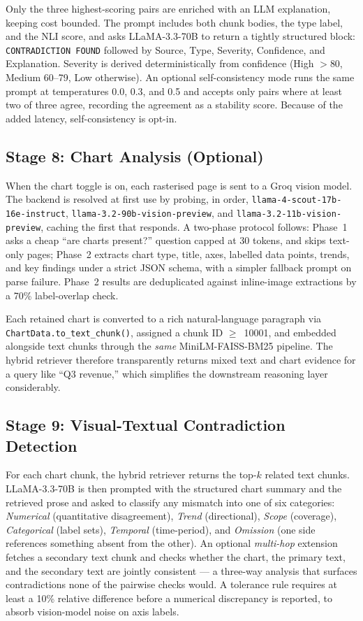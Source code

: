 \documentclass[conference]{IEEEtran}
\begin{document}
Only the three highest-scoring pairs are enriched with an LLM explanation, keeping cost bounded. The prompt includes both chunk bodies, the type label, and the NLI score, and asks LLaMA-3.3-70B to return a tightly structured block: \texttt{CONTRADICTION FOUND} followed by Source, Type, Severity, Confidence, and Explanation. Severity is derived deterministically from confidence (High $>$80, Medium 60--79, Low otherwise). An optional self-consistency mode runs the same prompt at temperatures 0.0, 0.3, and 0.5 and accepts only pairs where at least two of three agree, recording the agreement as a stability score. Because of the added latency, self-consistency is opt-in.

\subsection{Stage 8: Chart Analysis (Optional)}
When the chart toggle is on, each rasterised page is sent to a Groq vision model. The backend is resolved at first use by probing, in order, \texttt{llama-4-scout-17b-16e-instruct}, \texttt{llama-3.2-90b-vision-preview}, and \texttt{llama-3.2-11b-vision-preview}, caching the first that responds. A two-phase protocol follows: Phase~1 asks a cheap ``are charts present?'' question capped at 30 tokens, and skips text-only pages; Phase~2 extracts chart type, title, axes, labelled data points, trends, and key findings under a strict JSON schema, with a simpler fallback prompt on parse failure. Phase~2 results are deduplicated against inline-image extractions by a 70\% label-overlap check.

Each retained chart is converted to a rich natural-language paragraph via \texttt{ChartData.to\_text\_chunk()}, assigned a chunk ID $\geq$~10001, and embedded alongside text chunks through the \emph{same} MiniLM-FAISS-BM25 pipeline. The hybrid retriever therefore transparently returns mixed text and chart evidence for a query like ``Q3 revenue,'' which simplifies the downstream reasoning layer considerably.

\subsection{Stage 9: Visual-Textual Contradiction Detection}
For each chart chunk, the hybrid retriever returns the top-$k$ related text chunks. LLaMA-3.3-70B is then prompted with the structured chart summary and the retrieved prose and asked to classify any mismatch into one of six categories: \emph{Numerical} (quantitative disagreement), \emph{Trend} (directional), \emph{Scope} (coverage), \emph{Categorical} (label sets), \emph{Temporal} (time-period), and \emph{Omission} (one side references something absent from the other). An optional \emph{multi-hop} extension fetches a secondary text chunk and checks whether the chart, the primary text, and the secondary text are jointly consistent --- a three-way analysis that surfaces contradictions none of the pairwise checks would. A tolerance rule requires at least a 10\% relative difference before a numerical discrepancy is reported, to absorb vision-model noise on axis labels.
\end{document}
